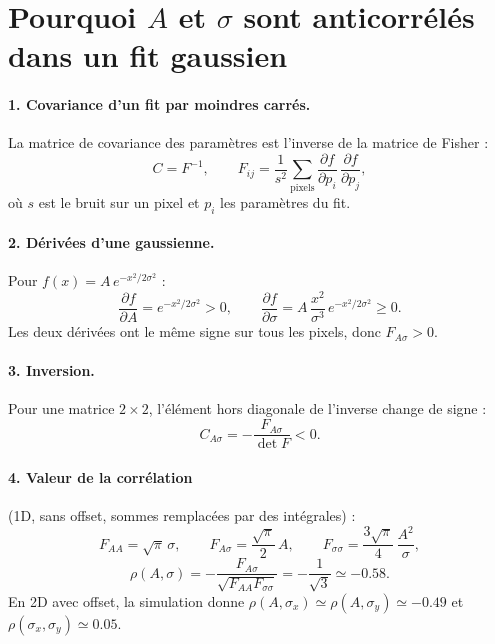 \documentclass[11pt]{article}
\begin{document}
\section*{Pourquoi $A$ et $\sigma$ sont anticorrélés dans un fit gaussien}

\paragraph{1. Covariance d'un fit par moindres carrés.}
La matrice de covariance des paramètres est l'inverse de la matrice de Fisher :
\begin{equation}
C = F^{-1}, \qquad
F_{ij} = \frac{1}{s^2}\sum_{\text{pixels}} \frac{\partial f}{\partial p_i}\,\frac{\partial f}{\partial p_j},
\end{equation}
où $s$ est le bruit sur un pixel et $p_i$ les paramètres du fit.

\paragraph{2. Dérivées d'une gaussienne.}
Pour $f(x) = A\,e^{-x^2/2\sigma^2}$ :
\begin{equation}
\frac{\partial f}{\partial A} = e^{-x^2/2\sigma^2} > 0,
\qquad
\frac{\partial f}{\partial \sigma} = A\,\frac{x^2}{\sigma^3}\,e^{-x^2/2\sigma^2} \geq 0 .
\end{equation}
Les deux dérivées ont le même signe sur tous les pixels, donc $F_{A\sigma} > 0$.

\paragraph{3. Inversion.}
Pour une matrice $2\times2$, l'élément hors diagonale de l'inverse change de signe :
\begin{equation}
C_{A\sigma} = -\frac{F_{A\sigma}}{\det F} < 0 .
\end{equation}

\paragraph{4. Valeur de la corrélation} (1D, sans offset, sommes remplacées par des intégrales) :
\begin{equation}
F_{AA} = \sqrt{\pi}\,\sigma,\qquad
F_{A\sigma} = \frac{\sqrt{\pi}}{2}\,A,\qquad
F_{\sigma\sigma} = \frac{3\sqrt{\pi}}{4}\,\frac{A^2}{\sigma},
\end{equation}
\begin{equation}
\rho(A,\sigma) = -\frac{F_{A\sigma}}{\sqrt{F_{AA}F_{\sigma\sigma}}} = -\frac{1}{\sqrt{3}} \simeq -0.58 .
\end{equation}
En 2D avec offset, la simulation donne $\rho(A,\sigma_x)\simeq\rho(A,\sigma_y)\simeq-0.49$ et $\rho(\sigma_x,\sigma_y)\simeq0.05$.
\end{document}
